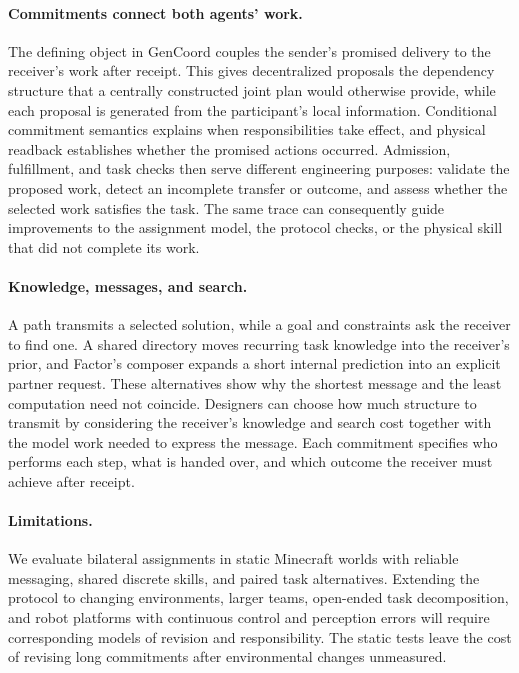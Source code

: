 \documentclass[sigconf,nonacm,balance=false]{aamas}
\begin{document}
\paragraph{Commitments connect both agents' work.}
The defining object in GenCoord couples the sender's promised delivery to the receiver's work after receipt. This gives decentralized proposals the dependency structure that a centrally constructed joint plan would otherwise provide, while each proposal is generated from the participant's local information. Conditional commitment semantics explains when responsibilities take effect, and physical readback establishes whether the promised actions occurred. Admission, fulfillment, and task checks then serve different engineering purposes: validate the proposed work, detect an incomplete transfer or outcome, and assess whether the selected work satisfies the task. The same trace can consequently guide improvements to the assignment model, the protocol checks, or the physical skill that did not complete its work.

\paragraph{Knowledge, messages, and search.}
A path transmits a selected solution, while a goal and constraints ask the receiver to find one. A shared directory moves recurring task knowledge into the receiver's prior, and Factor's composer expands a short internal prediction into an explicit partner request. These alternatives show why the shortest message and the least computation need not coincide. Designers can choose how much structure to transmit by considering the receiver's knowledge and search cost together with the model work needed to express the message. Each commitment specifies who performs each step, what is handed over, and which outcome the receiver must achieve after receipt.

\paragraph{Limitations.}
We evaluate bilateral assignments in static Minecraft worlds with reliable messaging, shared discrete skills, and paired task alternatives. Extending the protocol to changing environments, larger teams, open-ended task decomposition, and robot platforms with continuous control and perception errors will require corresponding models of revision and responsibility. The static tests leave the cost of revising long commitments after environmental changes unmeasured.
\end{document}
